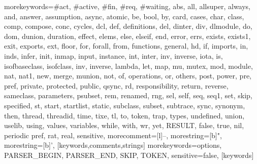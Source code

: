  {morekeywords={\#act, \#active, \#fin, \#req, \#waiting, abs, all, allsuper, always, and, answer, 
     assumption, async, atomic, be, bool, by, card, cases, char, class, comp, compose, conc, cycles,
     dcl, def, definitions, del, dinter, div, dlmodule, do, dom, dunion, duration, effect, elems, else, elseif, end,
     error, errs, exists, exists1, exit, exports, ext, floor, for, forall, from, functions, 
     general, hd, if, imports, in, inds, infer, init, inmap, input, instance, int, inter, inv, inverse, iota, is, 
     isofbaseclass, isofclass, inv, inverse, lambda, let, map, mu,
     mutex, mod, module, nat, nat1, new, merge, 
     munion, not, of, operations, or, others, post, power, pre, pref, 
     private, protected, public, qsync, rd, responsibility, return, reverse,  
     sameclass, parameters, psubset, rem, renamed, rng, sel, self, seq, seq1, set, skip, specified, st, 
     start, startlist, static, subclass, subset, subtrace, sync, synonym, then, thread, 
     threadid, time, tixe, tl, to, token, trap, types, undefined,
     union, uselib, using, values, 
     variables, while, with, wr, yet, RESULT, false, true, nil, periodic pref, rat, real},
   sensitive,
   morecomment=[l]--,
   morestring=[b]",
   morestring=[b]',
  }[keywords,comments,strings]
  {morekeywords={options, PARSER\_BEGIN, PARSER\_END, SKIP, TOKEN},
   sensitive=false,
  }[keywords]
